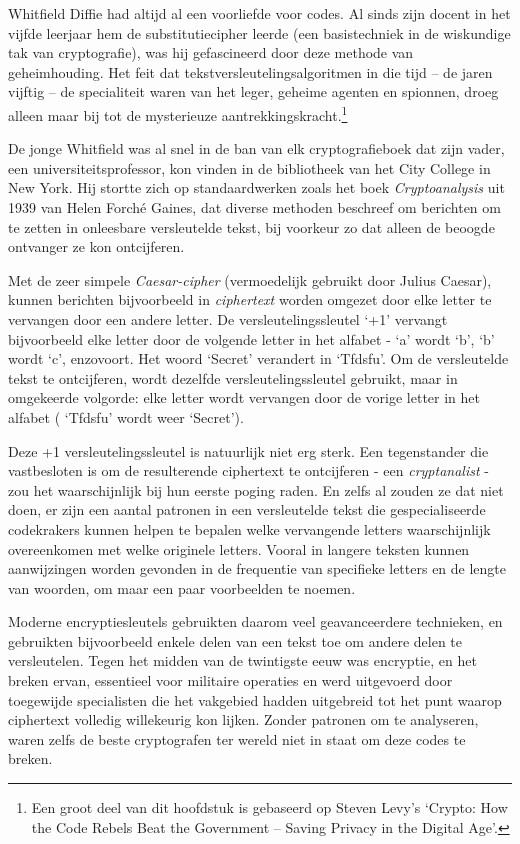 \documentclass[
  a5paper,
  smalldemyvopaper,11pt,twoside,onecolumn,openright,extrafontsizes]{memoir}
\begin{document}
Whitfield Diffie had altijd al een voorliefde voor codes. Al sinds zijn
docent in het vijfde leerjaar hem de substitutiecipher leerde (een
basistechniek in de wiskundige tak van cryptografie), was hij
gefascineerd door deze methode van geheimhouding. Het feit dat
tekstversleutelingsalgoritmen in die tijd -- de jaren vijftig -- de
specialiteit waren van het leger, geheime agenten en spionnen, droeg
alleen maar bij tot de mysterieuze aantrekkingskracht.\footnote{Een
  groot deel van dit hoofdstuk is gebaseerd op Steven Levy's `Crypto:
  How the Code Rebels Beat the Government -- Saving Privacy in the
  Digital Age'.}

De jonge Whitfield was al snel in de ban van elk cryptografieboek dat
zijn vader, een universiteitsprofessor, kon vinden in de bibliotheek van
het City College in New York. Hij stortte zich op standaardwerken zoals
het boek \emph{Cryptoanalysis} uit 1939 van Helen Forché Gaines, dat
diverse methoden beschreef om berichten om te zetten in onleesbare
versleutelde tekst, bij voorkeur zo dat alleen de beoogde ontvanger ze
kon ontcijferen.

Met de zeer simpele \emph{Caesar-cipher} (vermoedelijk gebruikt door
Julius Caesar), kunnen berichten bijvoorbeeld in \emph{ciphertext}
worden omgezet door elke letter te vervangen door een andere letter. De
versleutelingssleutel `+1' vervangt bijvoorbeeld elke letter door de
volgende letter in het alfabet - `a' wordt `b', `b' wordt `c',
enzovoort. Het woord `Secret' verandert in `Tfdsfu'. Om de versleutelde
tekst te ontcijferen, wordt dezelfde versleutelingssleutel gebruikt,
maar in omgekeerde volgorde: elke letter wordt vervangen door de vorige
letter in het alfabet ( `Tfdsfu' wordt weer `Secret').

Deze +1 versleutelingssleutel is natuurlijk niet erg sterk. Een
tegenstander die vastbesloten is om de resulterende ciphertext te
ontcijferen - een \emph{cryptanalist} - zou het waarschijnlijk bij hun
eerste poging raden. En zelfs al zouden ze dat niet doen, er zijn een
aantal patronen in een versleutelde tekst die gespecialiseerde
codekrakers kunnen helpen te bepalen welke vervangende letters
waarschijnlijk overeenkomen met welke originele letters. Vooral in
langere teksten kunnen aanwijzingen worden gevonden in de frequentie van
specifieke letters en de lengte van woorden, om maar een paar
voorbeelden te noemen.

Moderne encryptiesleutels gebruikten daarom veel geavanceerdere
technieken, en gebruikten bijvoorbeeld enkele delen van een tekst toe om
andere delen te versleutelen. Tegen het midden van de twintigste eeuw
was encryptie, en het breken ervan, essentieel voor militaire operaties
en werd uitgevoerd door toegewijde specialisten die het vakgebied hadden
uitgebreid tot het punt waarop ciphertext volledig willekeurig kon
lijken. Zonder patronen om te analyseren, waren zelfs de beste
cryptografen ter wereld niet in staat om deze codes te breken.
\end{document}
